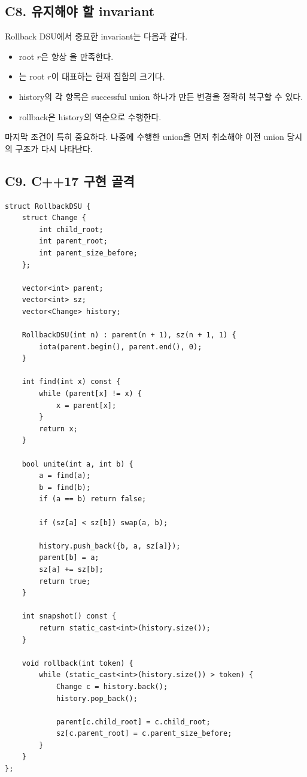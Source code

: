 \subsection{C8. 유지해야 할 invariant}
Rollback DSU에서 중요한 invariant는 다음과 같다.
\begin{itemize}
\item root $r$은 항상 을 만족한다.
\item {}는 root $r$이 대표하는 현재 집합의 크기다.
\item history의 각 항목은 successful union 하나가 만든 변경을 정확히 복구할 수 있다.
\item rollback은 history의 역순으로 수행한다.
\end{itemize}

마지막 조건이 특히 중요하다. 나중에 수행한 union을 먼저 취소해야 이전 union 당시의 구조가 다시 나타난다.

\subsection{C9. C++17 구현 골격}
\begin{lstlisting}
struct RollbackDSU {
    struct Change {
        int child_root;
        int parent_root;
        int parent_size_before;
    };

    vector<int> parent;
    vector<int> sz;
    vector<Change> history;

    RollbackDSU(int n) : parent(n + 1), sz(n + 1, 1) {
        iota(parent.begin(), parent.end(), 0);
    }

    int find(int x) const {
        while (parent[x] != x) {
            x = parent[x];
        }
        return x;
    }

    bool unite(int a, int b) {
        a = find(a);
        b = find(b);
        if (a == b) return false;

        if (sz[a] < sz[b]) swap(a, b);

        history.push_back({b, a, sz[a]});
        parent[b] = a;
        sz[a] += sz[b];
        return true;
    }

    int snapshot() const {
        return static_cast<int>(history.size());
    }

    void rollback(int token) {
        while (static_cast<int>(history.size()) > token) {
            Change c = history.back();
            history.pop_back();

            parent[c.child_root] = c.child_root;
            sz[c.parent_root] = c.parent_size_before;
        }
    }
};
\end{lstlisting}

